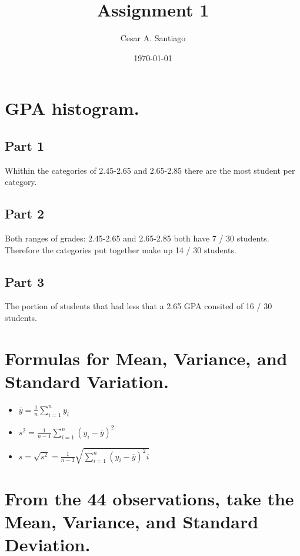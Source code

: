 \documentclass[a4paper,12px] {article}
\begin{document}
\title{Assignment 1}
\author{Cesar A. Santiago}
\date{\today}
\maketitle

\tableofcontents
\newpage
{}

\section{GPA histogram.}
\subsection{Part 1}
Whithin the categories of 2.45-2.65 and 2.65-2.85 there are the most student
per category.
\subsection{Part 2}
Both ranges of grades: 2.45-2.65 and 2.65-2.85 both have 7 / 30 students. Therefore the categories put together make up 14 / 30 students.
\subsection{Part 3}
The portion of students that had less that a 2.65 GPA consited of 16 / 30 students.

\section{Formulas for Mean, Variance, and Standard Variation.}
\begin{itemize}
\item $ \overline{y} = \frac{1}{n} \sum_{i = 1} ^ n y_i $
\item $ s ^ 2 = \frac{1}{n - 1} \sum_{i = 1} ^ n ( y_i - \overline{y})^2 $
\item $ s = \sqrt{s^2} = \frac{1}{n - 1}\sqrt{ \sum_{i = 1} ^ n ( y_i - \overline{y})^2i} $
\end{itemize}

\section{From the 44 observations, take the Mean, Variance, and Standard Deviation.}
\end{document}
